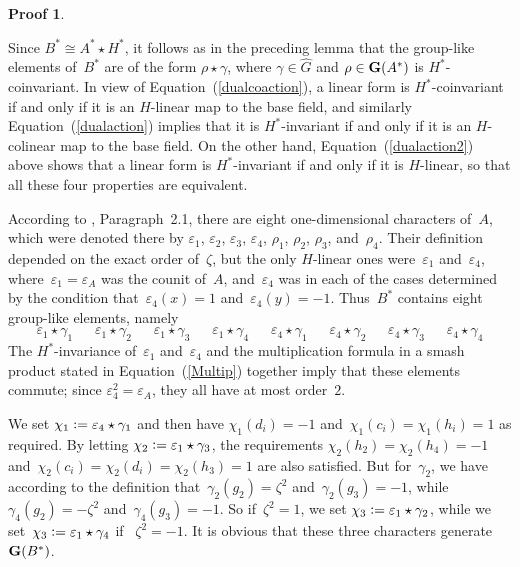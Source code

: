 \documentclass{article}
\newcounter{num}
\newenvironment{pflist}{\begin{list}{(\arabic{num})}{\usecounter{num} \leftmargin0cm \itemindent5pt}}{\end{list}}
\newcounter{num1}
\numberwithin{equation}{section}
\theoremstyle{definition}
\newtheorem*{pf}{Proof}
\theoremstyle{break}
\newcommand{\deq}{\vcentcolon =}
\newcommand{\K}{1}
\newcommand{\1}{{(1)}}
\newcommand{\2}{{(2)}}
\newcommand{\3}{{(3)}}
\newcommand{\ea}{{\varepsilon_{A}}}
\newcommand{\el}{{\varepsilon}}
\begin{document}
\begin{pf}
\begin{pflist}
\item
Since  $B^* \cong A^*\star H^*$, it follows as in the preceding lemma that the group-like elements of~$B^*$ are of the form $\rho \star \gamma$, where $\gamma \in \hat G$ and $\rho \in {\bf G}(A^*)$ is $H^*$-coinvariant. In view of Equation~(\ref{dualcoaction}), a linear form is  $H^*$-coinvariant if and only if it is an $H$-linear map to the base field, and similarly Equation~(\ref{dualaction}) implies that it is $H^*$-invariant if and only if it is an $H$-colinear map to the base field. On the other hand, Equation~(\ref{dualaction2}) above shows that a linear form is $H^*$-invariant if and only if it is $H$-linear, so that all these four properties are equivalent.

\item
According to \cite{KaSo2}, Paragraph~2.1, there are eight one-dimensional characters of~$A$, which were denoted there by $\varepsilon_1$, $\varepsilon_2$, $\varepsilon_3$, $\varepsilon_4$,
$\rho_1$, $\rho_2$, $\rho_3$, and~$\rho_4$. Their definition depended on the exact order of~$\zeta$, but the only $H$-linear ones were~$\el_1$ and~$\el_4$, where~\mbox{$\el_1 = \ea$} was the counit of~$A$, and~$\el_4$ was in each of the cases determined by the condition
that~$\el_4(x) = \K$ and~$\el_4(y) = -\K$. Thus~$B^*$ contains eight group-like elements, namely
\[\el_1 \star \gamma_1 \mspace{28mu} \el_1 \star \gamma_2 \mspace{28mu} \el_1 \star \gamma_3 \mspace{28mu} \el_1 \star \gamma_4 \mspace{28mu}
\el_4 \star \gamma_1 \mspace{28mu} \el_4 \star \gamma_2 \mspace{28mu} \el_4 \star \gamma_3 \mspace{28mu} \el_4 \star \gamma_4\]
The $H^*$-invariance of~$\el_1$ and~$\el_4$ and the multiplication formula in a smash product stated in Equation~(\ref{Multip}) together imply that these elements commute; since
\mbox{$\el_4^2 = \ea$}, they all have at most order~$2$.

\item
We set $\chi_1 \deq \el_4 \star \gamma_1$ and then have $\chi_1(d_i) = -1$
and~$ \chi_1(c_i) = \chi_1(h_i) = 1$ as required. By letting $\chi_2 \deq \el_1 \star \gamma_3$, the requirements \mbox{$\chi_2(h_2) = \chi_2(h_4) = -1$}
and~$\chi_2(c_i) = \chi_2 (d_i) = \chi_2(h_3) = 1$ are also satisfied. But for~$\gamma_2$, we have according to the definition that~$\gamma_2(g_2) = \zeta^2$ and~$\gamma_2(g_3) = -1$, while~\mbox{$\gamma_4(g_2) = -\zeta^2$} and~\mbox{$\gamma_4(g_3) = -1$}. So if~$\zeta^2 = 1$, we set $\chi_3 \deq \el_1 \star \gamma_2$, while we set~$\chi_3 \deq \el_1 \star \gamma_4$ if ~$\zeta^2 = -1$. It is obvious that these three characters generate~${\bf G}(B^*)$.


\end{pflist}
\end{pf}
\end{document}
